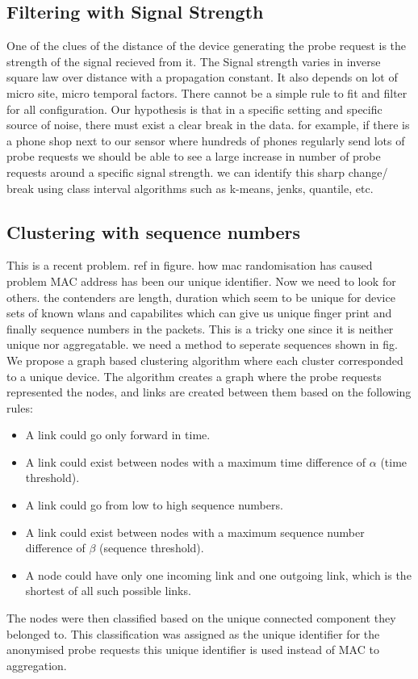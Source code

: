 \subsection{Filtering with Signal Strength}
One of the clues of the distance of the device generating the probe request is
the strength of the signal recieved from it.
The Signal strength varies in inverse square law over distance with a 
propagation constant.
It also depends on lot of micro site, micro temporal factors.
There cannot be a simple rule to fit and filter for all configuration.
Our hypothesis is that in a specific setting and specific source of noise,
there must exist a clear break in the data.
for example, if there is a phone shop next to our sensor where
hundreds of phones regularly send lots of probe requests
we should be able to see a large increase in number of probe requests around
a specific signal strength.
we can identify this sharp change/ break using class interval algorithms such as
k-means, jenks, quantile, etc.

\subsection{Clustering with sequence numbers}
This is a recent problem. ref in figure. how mac randomisation has caused problem
MAC address has been our unique identifier. Now we need to look for others.
the contenders are length, duration which seem to be unique for device
sets of known wlans and capabilites which can give us unique finger print and 
finally sequence numbers in the packets.
This is a tricky one since it is neither unique nor aggregatable.
we need a method to seperate sequences shown in fig.
We propose a graph based clustering algorithm where
each cluster corresponded to a unique device.
The algorithm creates a graph where the probe requests represented the nodes, 
and links are created between them based on the following rules: 
\begin{itemize}
	\item A link could go only forward in time. 
	\item A link could exist between nodes with a maximum
		time difference of $\alpha$ (time threshold).
	\item A link could go from low to high sequence numbers.
	\item A link could exist between nodes with a maximum sequence
		number difference of $\beta$ (sequence threshold).
	\item A node could have only one incoming link and
		one outgoing link, which is the
		shortest of all such possible links.
\end{itemize}
The nodes were then classified based on the unique connected component they belonged to.
This classification was assigned as the unique identifier for the anonymised probe requests
this unique identifier is used instead of MAC to aggregation.

